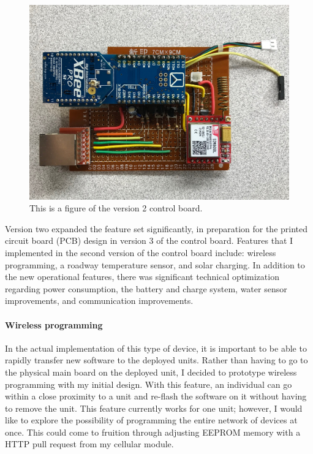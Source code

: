 \documentclass[letter]{article}
\begin{document}
\begin{figure}[ht]
	\centering
	\includegraphics[width=.7\textwidth]{img/v2_controlBoard.jpg}
	\caption{\label{fig:v2_controlBoard} This is a figure of the version 2 control board.}
\end{figure}

Version two expanded the feature set significantly, in preparation for the printed circuit board (PCB) design in version 3 of the control board. Features that I implemented in the second version of the control board include: wireless programming, a roadway temperature sensor, and solar charging. In addition to the new operational features, there was significant technical optimization regarding power consumption, the battery and charge system, water sensor improvements, and communication improvements. 

\paragraph{Wireless programming} In the actual implementation of this type of device, it is important to be able to rapidly transfer new software to the deployed units. Rather than having to go to the physical main board on the deployed unit, I decided to prototype wireless programming with my initial design. With this feature, an individual can go within a close proximity to a unit and re-flash the software on it without having to remove the unit. This feature currently works for one unit; however, I would like to explore the possibility of programming the entire network of devices at once. This could come to fruition through adjusting EEPROM memory with a HTTP pull request from my cellular module. 
\end{document}
